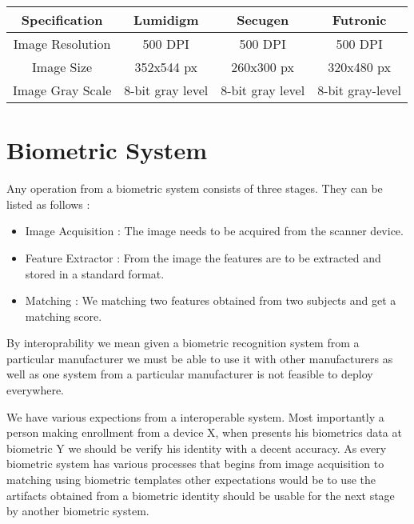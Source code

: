 \documentclass{article}
\begin{document}
\begin{center}
	\begin{tabular}{ | c | c | c | c | }
	\hline
	Specification & Lumidigm & Secugen & Futronic \\
	\hline
	Image Resolution & 500 DPI & 500 DPI & 500 DPI \\
	\hline
	Image Size & 352x544 px & 260x300 px & 320x480 px \\
	\hline
	Image Gray Scale & 8-bit gray level & 8-bit gray level & 8-bit gray-level \\
	\hline	
	\end{tabular}
\end{center}


\section*{Biometric System}
Any operation from a biometric system consists of three stages. They can be listed as follows :
\begin{itemize}
	\item Image Acquisition : The image needs to be acquired from the scanner device.
	\item Feature Extractor : From the image the features are to be extracted and stored in a standard format.
	\item Matching : We matching two features obtained from two subjects and get a matching score.
\end{itemize}

By interoprability we mean given a biometric recognition system from a particular manufacturer we must be able to use it with other manufacturers as well
as one system from a particular manufacturer is not feasible to deploy everywhere.

We have various expections from a interoperable system. Most importantly a person making enrollment from a device X, when  presents his biometrics data at biometric Y we should be verify his identity with a decent accuracy. As every biometric system has various processes that begins from image acquisition to matching using biometric templates other expectations would be to use the artifacts obtained from a biometric identity should be usable for the next stage by another biometric system.
\end{document}
